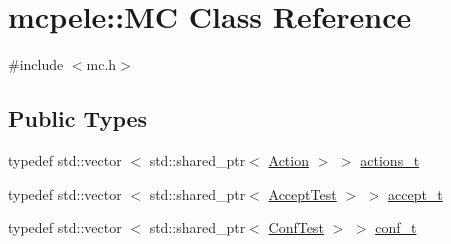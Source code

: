 \hypertarget{classmcpele_1_1MC}{\section{mcpele\-:\-:\-M\-C \-Class \-Reference}
\label{classmcpele_1_1MC}
}


{\ttfamily \#include $<$mc.\-h$>$}

\subsection*{\-Public \-Types}
\begin{DoxyCompactItemize}
\item 
typedef std\-::vector\*
$<$ std\-::shared\-\_\-ptr$<$ \hyperlink{classmcpele_1_1Action}{\-Action} $>$ $>$ \hyperlink{classmcpele_1_1MC_a6b0a924bb76c28b6fc25c66675c1dcf9}{actions\-\_\-t}
\item 
typedef std\-::vector\*
$<$ std\-::shared\-\_\-ptr$<$ \hyperlink{classmcpele_1_1AcceptTest}{\-Accept\-Test} $>$ $>$ \hyperlink{classmcpele_1_1MC_ab52ae82dba8e7299583f48a382f8bd5a}{accept\-\_\-t}
\item 
typedef std\-::vector\*
$<$ std\-::shared\-\_\-ptr$<$ \hyperlink{classmcpele_1_1ConfTest}{\-Conf\-Test} $>$ $>$ \hyperlink{classmcpele_1_1MC_a025b387c3222c83625323afcddeda1ea}{conf\-\_\-t}
\end{DoxyCompactItemize}
